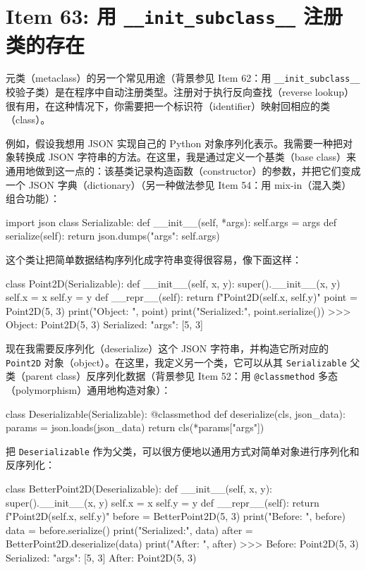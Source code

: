 \section{Item 63: 用 \texttt{\_\_init\_subclass\_\_} 注册类的存在}

元类（metaclass）的另一个常见用途（背景参见 Item 62：用 \texttt{\_\_init\_subclass\_\_} 校验子类）是在程序中自动注册类型。注册对于执行反向查找（reverse lookup）很有用，在这种情况下，你需要把一个标识符（identifier）映射回相应的类（class）。

例如，假设我想用 JSON 实现自己的 Python 对象序列化表示。我需要一种把对象转换成 JSON 字符串的方法。在这里，我是通过定义一个基类（base class）来通用地做到这一点的：该基类记录构造函数（constructor）的参数，并把它们变成一个 JSON 字典（dictionary）（另一种做法参见 Item 54：用 mix-in（混入类）组合功能）：

\begin{codebox}[python]
import json
class Serializable:
    def __init__(self, *args):
        self.args = args
    def serialize(self):
        return json.dumps({"args": self.args})
\end{codebox}

这个类让把简单数据结构序列化成字符串变得很容易，像下面这样：

\begin{codebox}[python]
class Point2D(Serializable):
    def __init__(self, x, y):
        super().__init__(x, y)
        self.x = x
        self.y = y
    def __repr__(self):
        return f"Point2D({self.x}, {self.y})"
point = Point2D(5, 3)
print("Object:    ", point)
print("Serialized:", point.serialize())
>>>
Object:     Point2D(5, 3)
Serialized: {"args": [5, 3]}
\end{codebox}

现在我需要反序列化（deserialize）这个 JSON 字符串，并构造它所对应的 \texttt{Point2D} 对象（object）。在这里，我定义另一个类，它可以从其 \texttt{Serializable} 父类（parent class）反序列化数据（背景参见 Item 52：用 \texttt{@classmethod} 多态（polymorphism）通用地构造对象）：

\begin{codebox}[python]
class Deserializable(Serializable):
    @classmethod
    def deserialize(cls, json_data):
        params = json.loads(json_data)
        return cls(*params["args"])
\end{codebox}

把 \texttt{Deserializable} 作为父类，可以很方便地以通用方式对简单对象进行序列化和反序列化：

\begin{codebox}[python]
class BetterPoint2D(Deserializable):
    def __init__(self, x, y):
        super().__init__(x, y)
        self.x = x
        self.y = y
    def __repr__(self):
        return f"Point2D({self.x}, {self.y})"
before = BetterPoint2D(5, 3)
print("Before:    ", before)
data = before.serialize()
print("Serialized:", data)
after = BetterPoint2D.deserialize(data)
print("After:     ", after)
>>>
Before:     Point2D(5, 3)
Serialized: {"args": [5, 3]}
After:      Point2D(5, 3)
\end{codebox}

